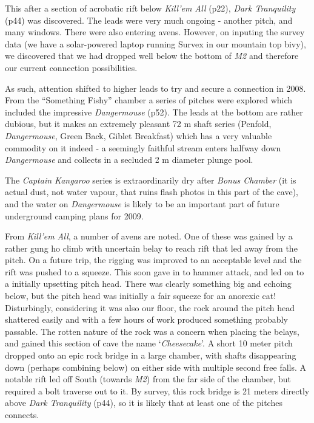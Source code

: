 This after a section of acrobatic rift below \emph{Kill'em All} (p22),
\emph{Dark Tranquility} (p44) was discovered. The leads were very much
ongoing - another pitch, and many windows. There were also entering
avens. However, on inputing the survey data (we have a solar-powered
laptop running Survex in our mountain top bivy), we discovered that we
had dropped well below the bottom of \emph{M2} and therefore our current
connection possibilities.

As such, attention shifted to higher leads to try and secure a
connection in 2008. From the ``Something Fishy'' chamber a series of
pitches were explored which included the impressive \emph{Dangermouse}
(p52). The leads at the bottom are rather dubious, but it makes an
extremely pleasant 72 m shaft series (Penfold, \emph{Dangermouse}, Green
Back, Giblet Breakfast) which has a very valuable commodity on it indeed
- a seemingly faithful stream enters halfway down \emph{Dangermouse} and
collects in a secluded 2 m diameter plunge pool.

The \emph{Captain Kangaroo} series is extraordinarily dry after
\emph{Bonus Chamber} (it is actual dust, not water vapour, that ruins
flash photos in this part of the cave), and the water on
\emph{Dangermouse} is likely to be an important part of future
underground camping plans for 2009.

From \emph{Kill'em All}, a number of avens are noted. One of these was
gained by a rather gung ho climb with uncertain belay to reach rift that
led away from the pitch. On a future trip, the rigging was improved to
an acceptable level and the rift was pushed to a squeeze. This soon gave
in to hammer attack, and led on to a initially upsetting pitch head.
There was clearly something big and echoing below, but the pitch head
was initially a fair squeeze for an anorexic cat! Disturbingly,
considering it was also our floor, the rock around the pitch head
shattered easily and with a few hours of work produced something
probably passable. The rotten nature of the rock was a concern when
placing the belays, and gained this section of cave the name
`\emph{Cheesecake}'. A short 10 meter pitch dropped onto an epic rock
bridge in a large chamber, with shafts disappearing down (perhaps
combining below) on either side with multiple second free falls. A
notable rift led off South (towards \emph{M2}) from the far side of the
chamber, but required a bolt traverse out to it. By survey, this rock
bridge is 21 meters directly above \emph{Dark Tranquility} (p44), so it
is likely that at least one of the pitches connects.

